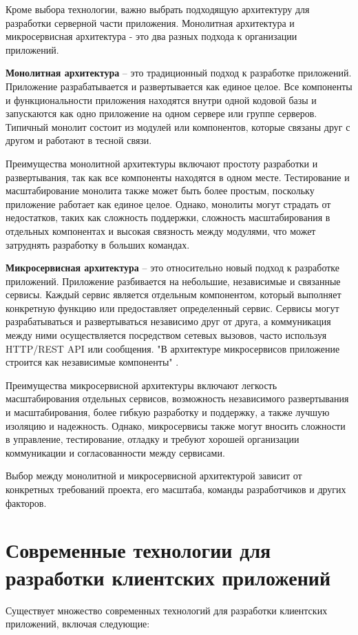Кроме выбора технологии, важно выбрать подходящую архитектуру для разработки серверной части приложения.
Монолитная архитектура и микросервисная архитектура - это два разных подхода к организации приложений.

\textbf{Монолитная архитектура} -- это традиционный подход к разработке приложений. 
Приложение разрабатывается и развертывается как единое целое. 
Все компоненты и функциональности приложения находятся внутри одной кодовой базы и запускаются как одно приложение на одном сервере или группе серверов. 
Типичный монолит состоит из модулей или компонентов, которые связаны друг с другом и работают в тесной связи.

Преимущества монолитной архитектуры включают простоту разработки и развертывания, 
так как все компоненты находятся в одном месте. 
Тестирование и масштабирование монолита также может быть более простым, 
поскольку приложение работает как единое целое. Однако, монолиты могут страдать от недостатков, 
таких как сложность поддержки, сложность масштабирования в отдельных компонентах и 
высокая связность между модулями, что может затруднять разработку в больших командах.

\textbf{Микросервисная архитектура} -- это относительно новый подход к разработке приложений. 
Приложение разбивается на небольшие, независимые и связанные сервисы. 
Каждый сервис является отдельным компонентом, который выполняет конкретную функцию или предоставляет определенный сервис. 
Сервисы могут разрабатываться и развертываться независимо друг от друга, 
а коммуникация между ними осуществляется посредством сетевых вызовов, 
часто используя HTTP/REST API или сообщения.
"В архитектуре микросервисов приложение строится как независимые компоненты" \cite{Kravchenko2022}.

Преимущества микросервисной архитектуры включают легкость масштабирования отдельных сервисов,
возможность независимого развертывания и масштабирования, более гибкую разработку и поддержку,
а также лучшую изоляцию и надежность. Однако, микросервисы также могут вносить сложности в управление,
тестирование, отладку и требуют хорошей организации коммуникации и согласованности между сервисами.

Выбор между монолитной и микросервисной архитектурой зависит от
конкретных требований проекта, его масштаба,
команды разработчиков и других факторов.



\section{Современные технологии для разработки клиентских приложений}
Существует множество современных технологий для разработки клиентских приложений, включая следующие:

